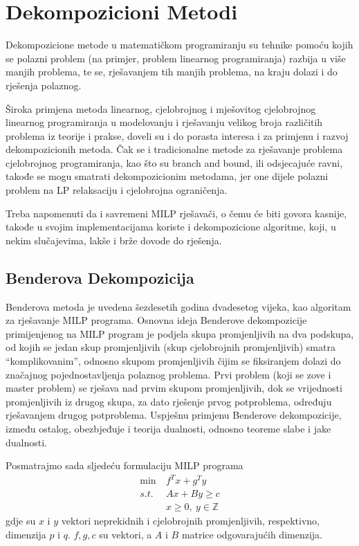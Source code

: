 \documentclass[a4paper, utf8, 11pt, colorlinks]{book}
\begin{document}
 \newpage
 
 \chapter{Dekompozicioni Metodi}
 
Dekompozicione metode u matematičkom programiranju su tehnike pomoću kojih se polazni problem (na primjer, problem linearnog programiranja) razbija u više manjih problema, te se, rješavanjem tih manjih problema, na kraju dolazi i do rješenja polaznog.

Široka primjena metoda linearnog, cjelobrojnog i mješovitog cjelobrojnog linearnog programiranja u modelovanju i rješavanju velikog broja različitih problema iz teorije i prakse, doveli su i do porasta interesa i za primjenu i razvoj dekompozicionih metoda. Čak se i tradicionalne metode za rješavanje problema cjelobrojnog programiranja, kao što su branch and bound, ili odsjecajuće ravni, takođe se mogu smatrati dekompozicionim metodama, jer one dijele polazni problem na LP relaksaciju i cjelobrojna ograničenja.

Treba napomenuti da i savremeni MILP rješavači, o čemu će biti govora kasnije, takođe u svojim implementacijama koriste i dekompozicione algoritme, koji, u nekim slučajevima, lakše i brže dovode do rješenja.
 
 
 \section{Benderova Dekompozicija}
 
 Benderova metoda je uvedena šezdesetih godina dvadesetog vijeka, kao algoritam za rješavanje MILP programa. 
 Osnovna ideja Benderove dekompozicije primijenjenog na MILP program je podjela skupa promjenljivih na dva podskupa, od kojih se jedan skup promjenljivih (skup cjelobrojnih promjenljivih) smatra ``komplikovanim'', odnosno skupom promjenljivih čijim se fiksiranjem dolazi do značajnog pojednostavljenja polaznog problema. Prvi problem (koji se zove i master problem) se rješava nad prvim skupom promjenljivih, dok se vrijednosti promjenljivih iz drugog skupa,  za dato rješenje prvog potproblema, određuju rješavanjem drugog potproblema. Uspješnu primjenu Benderove dekompozicije, između ostalog, obezbjeđuje i teorija dualnosti, odnosno teoreme slabe i jake dualnosti.
 

 Posmatrajmo sada sljedeću formulaciju MILP programa
 \begin{equation}
 \begin{aligned}\label{bender1}
 \min\  &f^Tx+g^Ty\\
 s.t.\  &Ax+By\geqslant c\\
 &x\geqslant 0,\ y \in \mathbb{Z}
 \end{aligned}
\end{equation}
 gdje su $x$ i $y$ vektori neprekidnih i cjelobrojnih promjenljivih, respektivno, dimenzija $p$ i $q$. $f,g,c$ su vektori, a $A$ i $B$ matrice odgovarajućih dimenzija. 
 
\end{document}
